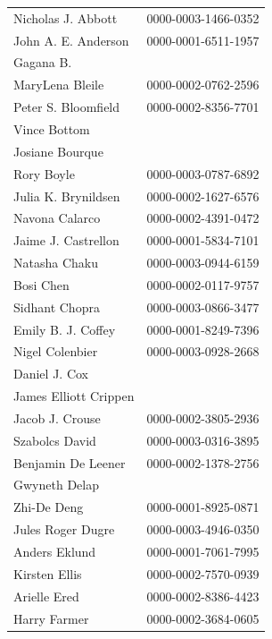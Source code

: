 \documentclass[fleqn,10pt,inline]{wlscirep}
\begin{document}
\begin{appendixbox}
\begin{longtable}{ll}
\bottomrule
\endlastfoot
        Nicholas J. Abbott & 0000-0003-1466-0352 \\
       John A. E. Anderson & 0000-0001-6511-1957 \\
                 Gagana B. &                     \\
           MaryLena Bleile & 0000-0002-0762-2596 \\
       Peter S. Bloomfield & 0000-0002-8356-7701 \\
              Vince Bottom &                     \\
           Josiane Bourque &                     \\
                Rory Boyle & 0000-0003-0787-6892 \\
       Julia K. Brynildsen & 0000-0002-1627-6576 \\
            Navona Calarco & 0000-0002-4391-0472 \\
       Jaime J. Castrellon & 0000-0001-5834-7101 \\
             Natasha Chaku & 0000-0003-0944-6159 \\
                 Bosi Chen & 0000-0002-0117-9757 \\
            Sidhant Chopra & 0000-0003-0866-3477 \\
        Emily B. J. Coffey & 0000-0001-8249-7396 \\
           Nigel Colenbier & 0000-0003-0928-2668 \\
             Daniel J. Cox &                     \\
     James Elliott Crippen &                     \\
           Jacob J. Crouse & 0000-0002-3805-2936 \\
            Szabolcs David & 0000-0003-0316-3895 \\
        Benjamin De Leener & 0000-0002-1378-2756 \\
             Gwyneth Delap &                     \\
               Zhi-De Deng & 0000-0001-8925-0871 \\
         Jules Roger Dugre & 0000-0003-4946-0350 \\
             Anders Eklund & 0000-0001-7061-7995 \\
             Kirsten Ellis & 0000-0002-7570-0939 \\
              Arielle Ered & 0000-0002-8386-4423 \\
              Harry Farmer & 0000-0002-3684-0605 \\

\end{longtable}
\end{appendixbox}
\end{document}
